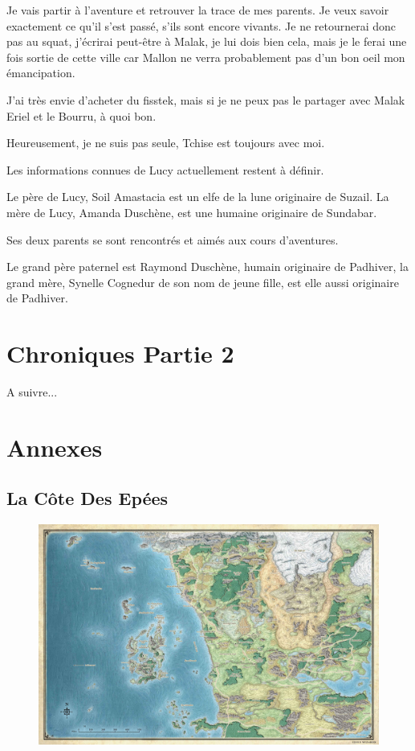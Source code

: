 \documentclass[10pt,a4paper,twoside,twocolumn,openany]{book}
\begin{document}
Je vais partir à l'aventure et retrouver la trace de mes parents. Je veux savoir exactement
ce qu'il s'est passé, s'ils sont encore vivants. Je ne retournerai donc pas au squat, j'écrirai
peut-être à Malak, je lui dois bien cela, mais je le ferai une fois sortie de cette ville car
Mallon ne verra probablement pas d'un bon oeil mon émancipation.

J'ai très envie d'acheter du fisstek, mais si je ne peux pas le partager avec 
Malak Eriel et le Bourru, à quoi bon.

Heureusement, je ne suis pas seule, Tchise est toujours avec moi.

\begin{quotebox}
Les informations connues de Lucy actuellement restent à définir.

Le père de Lucy, Soil Amastacia est un elfe de la lune originaire de Suzail.
La mère de Lucy, Amanda Duschène, est une humaine originaire de Sundabar.

Ses deux parents se sont rencontrés et aimés aux cours d'aventures.

Le grand père paternel est Raymond Duschène, humain originaire de Padhiver, 
la grand mère, Synelle Cognedur de son nom de jeune fille, est elle aussi
originaire de Padhiver.
\end{quotebox}

\chapter{Chroniques Partie 2}

A suivre...

\onecolumn
\chapter{Annexes}

\section{La Côte Des Epées} 

\begin{figure}[!h]
\centering
\includegraphics[width=\textwidth,keepaspectratio]{soc.jpg}
\end{figure}
\end{document}
